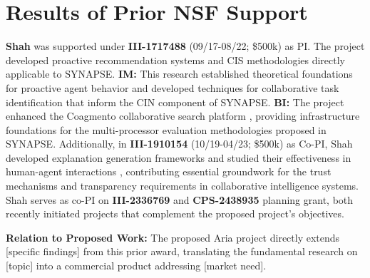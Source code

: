 \documentclass[11pt]{article}
\begin{document}
\section{Results of Prior NSF Support}
\label{sec:prior}
\vspace*{-8pt}
{\bf Shah} was supported under \textbf{III-1717488}  (09/17-08/22; \$500k) as PI. The project developed proactive recommendation systems and CIS methodologies directly applicable to SYNAPSE. \textbf{IM:} This research established theoretical foundations for proactive agent behavior \cite{shah2018information} and developed techniques for collaborative task identification \cite{mitsui2018much, mitsui2018broad} that inform the CIN component of SYNAPSE. \textbf{BI:} The project enhanced the Coagmento collaborative search platform \cite{mitsui2018coagmento}, providing infrastructure foundations for the multi-processor evaluation methodologies proposed in SYNAPSE. Additionally, in {\bf III-1910154} (10/19-04/23; \$500k) as Co-PI, Shah developed explanation generation frameworks and studied their effectiveness in human-agent interactions \cite{fu2020fairness, verma2024counterfactual}, contributing essential groundwork for the trust mechanisms and transparency requirements in collaborative intelligence systems. Shah serves as co-PI on \textbf{III-2336769} and \textbf{CPS-2438935} planning grant, both recently initiated projects that complement the proposed project's objectives.

\textbf{Relation to Proposed Work:}
The proposed Aria project directly extends [specific findings] from this 
prior award, translating the fundamental research on [topic] into a 
commercial product addressing [market need].



\end{document}
